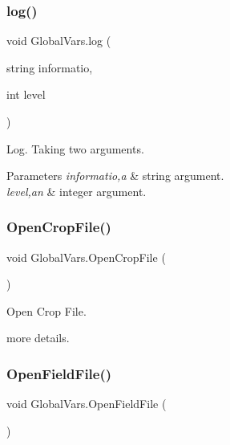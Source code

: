 \subsubsection{\texorpdfstring{log()}{log()}}
{\footnotesize\ttfamily void Global\+Vars.\+log (\begin{DoxyParamCaption}\item[{string}]{informatio,  }\item[{int}]{level }\end{DoxyParamCaption})\hspace{0.3cm}{\ttfamily [inline]}}



Log. Taking two arguments. 


\begin{DoxyParams}{Parameters}
{\em informatio,a} & string argument. \\
\hline
{\em level,an} & integer argument. \\
\hline
\end{DoxyParams}
\mbox{\label{class_global_vars_a96dcdedd261f3aaf43edfd203a3b940d}} 
\subsubsection{\texorpdfstring{OpenCropFile()}{OpenCropFile()}}
{\footnotesize\ttfamily void Global\+Vars.\+Open\+Crop\+File (\begin{DoxyParamCaption}{ }\end{DoxyParamCaption})\hspace{0.3cm}{\ttfamily [inline]}}



Open Crop File. 

more details. \mbox{\label{class_global_vars_a5eddc5dbbfc855539c90949c67595a0a}} 
\subsubsection{\texorpdfstring{OpenFieldFile()}{OpenFieldFile()}}
{\footnotesize\ttfamily void Global\+Vars.\+Open\+Field\+File (\begin{DoxyParamCaption}{ }\end{DoxyParamCaption})\hspace{0.3cm}{\ttfamily [inline]}}



